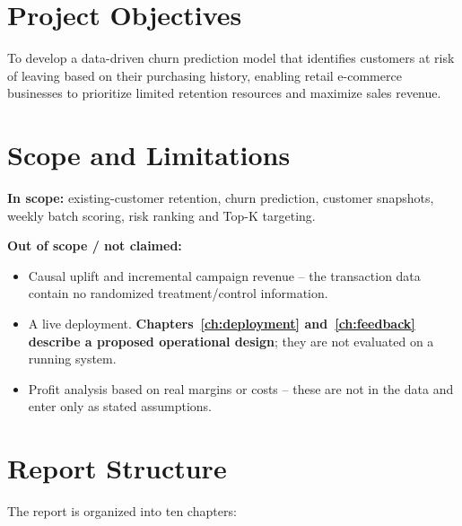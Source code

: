 \section{Project Objectives}
\label{sec:1-4}

To develop a data-driven churn prediction model that identifies customers at risk of leaving based on their purchasing history, enabling retail e-commerce businesses to prioritize limited retention resources and maximize sales revenue.

\section{Scope and Limitations}
\label{sec:1-5}

\textbf{In scope:} existing-customer retention, churn prediction, customer snapshots, weekly batch scoring, risk ranking and Top-K targeting.

\textbf{Out of scope / not claimed:}
\begin{itemize}
    \item Causal uplift and incremental campaign revenue -- the transaction data contain no randomized treatment/control information.
    \item A live deployment. \textbf{Chapters~\ref{ch:deployment} and~\ref{ch:feedback} describe a proposed operational design}; they are not evaluated on a running system.
    \item Profit analysis based on real margins or costs -- these are not in the data and enter only as stated assumptions.
\end{itemize}

\section{Report Structure}
\label{sec:1-6}

The report is organized into ten chapters:

